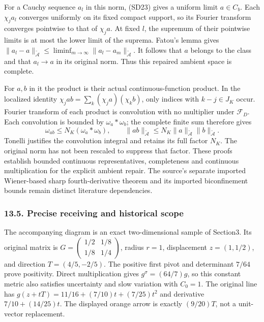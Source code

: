 \documentclass[
  11pt,
]{article}
\begin{document}
For a Cauchy sequence \(a_l\) in this norm, (SD23) gives a uniform limit
\(a\in C_b\). Each \(\chi_j a_l\) converges uniformly on its fixed
compact support, so its Fourier transform converges pointwise to that of
\(\chi_j a\). At fixed \(l\), the supremum of their pointwise limits is
at most the lower limit of the suprema. Fatou's lemma gives
\(\|a_l-a\|_{\widetilde{\mathcal A}}\le\liminf_{m\to\infty}\|a_l-a_m\|_{\widetilde{\mathcal A}}\).
It follows that \(a\) belongs to the class and that \(a_l\to a\) in its
original norm. Thus this repaired ambient space is complete.

For \(a,b\) in it the product is their actual continuous-function
product. In the localized identity
\(\chi_j ab=\sum_k(\chi_j a)(\chi_k b)\), only indices with
\(k-j\in J_K\) occur. Fourier transform of each product is convolution
with no multiplier under \(\mathcal F_D\). Each convolution is bounded
by \(\omega_a*\omega_b\); the complete finite sum therefore gives \[
 \omega_{ab}\le N_K(\omega_a*\omega_b),\qquad
 \|ab\|_{\widetilde{\mathcal A}}
 \le N_K\|a\|_{\widetilde{\mathcal A}}\|b\|_{\widetilde{\mathcal A}}.
 \tag{SD24}
\] Tonelli justifies the convolution integral and retains its full
factor \(N_K\). The original norm has not been rescaled to suppress that
factor. These proofs establish bounded continuous representatives,
completeness and continuous multiplication for the explicit ambient
repair. The source's separate imported Wiener-based sharp
fourth-derivative theorem and its imported biconfinement bounds remain
distinct literature dependencies.

\subsubsection{13.5. Precise receiving and historical
scope}\label{precise-receiving-and-historical-scope}

The accompanying diagram is an exact two-dimensional sample of Section3.
Its original matrix is
\(G=\begin{pmatrix}1/2&1/8\\1/8&1/4\end{pmatrix}\), radius \(r=1\),
displacement \(z=(1,1/2)\), and direction \(T=(4/5,-2/5)\). The positive
first pivot and determinant \(7/64\) prove positivity. Direct
multiplication gives \(g^\sigma=(64/7)g\), so this constant metric also
satisfies uncertainty and slow variation with \(C_0=1\). The original
line has \(g(z+tT)=11/16+(7/10)t+(7/25)t^2\) and derivative
\(7/10+(14/25)t\). The displayed orange arrow is exactly \((9/20)T\),
not a unit-vector replacement.
\end{document}
